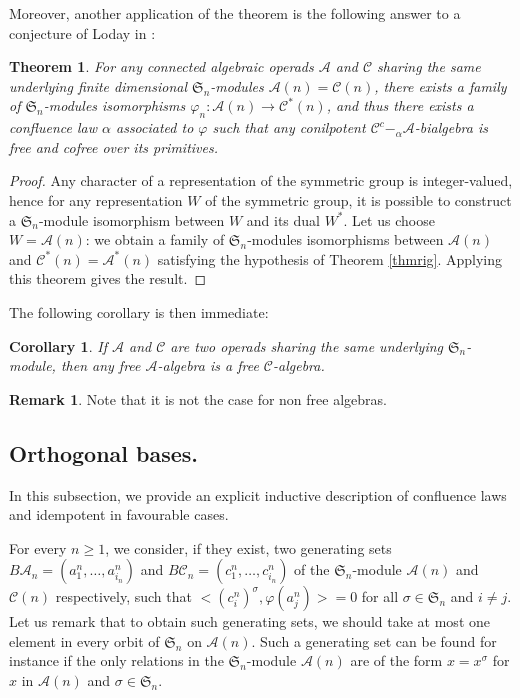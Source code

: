 \documentclass[11pt,leqno]{amsart}
\theoremstyle{definition}
\newtheorem{remark}[definition]{Remark}
\theoremstyle{plain}
\newtheorem{corollary}[definition]{Corollary}
\newtheorem{theorem}[definition]{Theorem}
\newcommand{\A}{ \mathcal{A} }
\newcommand{\C}{ \mathcal{C} }
\begin{document}
Moreover, another application of the theorem is the following answer to a conjecture of Loday in \cite{GBO}:

\begin{theorem}
For any connected algebraic operads $\A$ and $\C$ sharing the same underlying finite dimensional $\mathfrak{S}_n$-modules $\A(n)=\C(n)$, there exists a family of $\mathfrak{S}_n$-modules isomorphisms $\varphi_n: \A(n) \to \C^*(n)$, and thus there exists a confluence law $\alpha$ associated to $\varphi$ such that any conilpotent $\C^c-_{\alpha}\A$-bialgebra is free and cofree over its primitives.
\end{theorem}

\begin{proof}
Any character of a representation of the symmetric group is integer-valued, hence for any representation $W$ of the symmetric group, it is possible to construct a $\mathfrak{S}_n$-module isomorphism between $W$ and its dual $W^*$. Let us choose $W = \A(n)$: we obtain a family of $\mathfrak{S}_n$-modules isomorphisms between $\A(n)$ and $\C^*(n) = \A^*(n)$ satisfying the hypothesis of Theorem \ref{thmrig}. Applying this theorem gives the result.
\end{proof}

The following corollary is then immediate:
\begin{corollary}
If $\A$ and $\C$ are two operads sharing the same underlying $\mathfrak{S}_n$-module, then any free $\A$-algebra is a free $\C$-algebra.
\end{corollary}

\begin{remark}
Note that it is not the case for non free algebras.
\end{remark}

\subsection{Orthogonal bases.} \label{orthbas}

In this subsection, we provide an explicit inductive description of confluence laws and idempotent in favourable cases. 

For every $n \geq 1$, we consider, if they exist, two generating sets $B\A_n=(a^n_1,  \ldots, a^n_{i_n})$ and $B\C_n=(c^{n}_1,  \ldots, c^{n}_{i_n})$ of the $\mathfrak{S}_n$-module $\A(n)$ and $\C(n)$ respectively, such that $< \left(c^n_i\right)^{\sigma}, \varphi(a^n_j)>=0$ for all $\sigma \in \mathfrak{S}_n$ and $i \neq j$. Let us remark that to obtain such generating sets, we should take at most one element in every orbit of $\mathfrak{S}_n$ on $\A(n)$. Such a generating set can be found for instance if the only relations in the $\mathfrak{S}_n$-module $\A(n)$ are of the form $x = x^{\sigma}$ for $x$ in $\A(n)$ and $\sigma \in \mathfrak{S}_n$.
\end{document}
